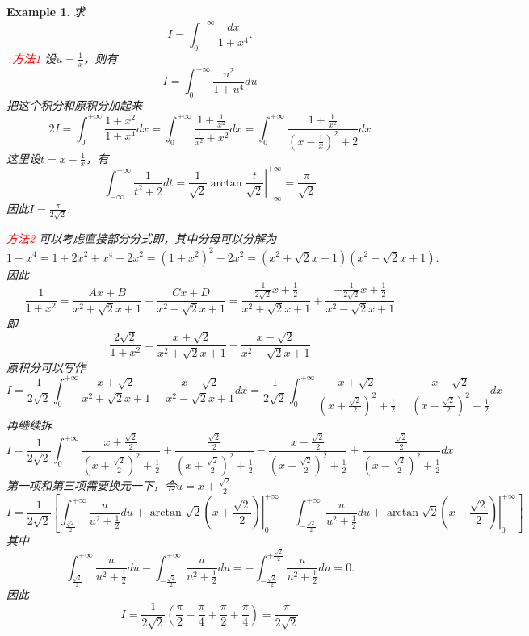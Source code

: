 \documentclass{article}
\newtheorem{example}[theorem]{Example}
\newcommand{\hints}{{\color{blue} \text{hints}}}
\newcommand{\redt}[1]{\textcolor{red}{#1}}
\begin{document}
\begin{example}
\rm 求
$$
I = \int_0^{+\infty} \frac{dx}{1+x^4}.
$$
\hints\ \redt{方法1} 设$u = \frac{1}{x}$，则有
$$
I = \int_0^{+\infty} \frac{u^2}{1+u^4}du
$$
把这个积分和原积分加起来
$$
2I = \int_0^{+\infty} \frac{1+x^2}{1+x^4}dx = \int_0^{+\infty} \frac{1+\frac{1}{x^2}}{\frac{1}{x^2}+x^2}dx = \int_0^{+\infty} \frac{1+\frac{1}{x^2}}{(x-\frac{1}{x})^2+2}dx
$$
这里设$t = x-\frac{1}{x}$，有
$$
\int_{-\infty}^{+\infty} \frac{1}{t^2+2}dt = \left. \frac{1}{\sqrt{2}}\arctan \frac{t}{\sqrt{2}}\right|_{-\infty}
^{+\infty} = \frac{\pi}{\sqrt{2}}
$$
因此$I = \frac{\pi}{2\sqrt{2}}$. 

\redt{方法2} 可以考虑直接部分分式即，其中分母可以分解为
$$
1+x^4 = 1+2x^2+x^4 - 2x^2 = (1+x^2)^2 - 2x^2 = (x^2+\sqrt{2}x+1)(x^2-\sqrt{2}x+1).   
$$
因此
$$
\frac{1}{1+x^2} = \frac{Ax+B}{x^2+\sqrt{2}x+1} + \frac{Cx+D}{x^2-\sqrt{2}x+1} = \frac{\frac{1}{2\sqrt{2}}x+\frac{1}{2}}{x^2+\sqrt{2}x+1} + \frac{-\frac{1}{2\sqrt{2}}x+\frac{1}{2}}{x^2-\sqrt{2}x+1}
$$
即
$$
\frac{2\sqrt{2}}{1+x^2} = \frac{x+\sqrt{2}}{x^2+\sqrt{2}x+1} - \frac{x-\sqrt{2}}{x^2-\sqrt{2}x+1}
$$
原积分可以写作
$$
I = \frac{1}{2\sqrt{2}} \int_0^{+\infty} \frac{x+\sqrt{2}}{x^2+\sqrt{2}x+1} - \frac{x-\sqrt{2}}{x^2-\sqrt{2}x+1} dx = \frac{1}{2\sqrt{2}} \int_0^{+\infty} \frac{x+\sqrt{2}}{(x+\frac{\sqrt{2}}{2})^2+\frac{1}{2}} - \frac{x-\sqrt{2}}{(x-\frac{\sqrt{2}}{2})^2+\frac{1}{2}} dx
$$
再继续拆
$$
I = \frac{1}{2\sqrt{2}} \int_0^{+\infty} \frac{x+\frac{\sqrt{2}}{2}}{(x+\frac{\sqrt{2}}{2})^2+\frac{1}{2}} + \frac{\frac{\sqrt{2}}{2}}{(x+\frac{\sqrt{2}}{2})^2+\frac{1}{2}} - \frac{x-\frac{\sqrt{2}}{2}}{(x-\frac{\sqrt{2}}{2})^2+\frac{1}{2}} + \frac{\frac{\sqrt{2}}{2}}{(x-\frac{\sqrt{2}}{2})^2+\frac{1}{2}} dx
$$
第一项和第三项需要换元一下，令$u = x+\frac{\sqrt{2}}{2}$
$$
I = \frac{1}{2\sqrt{2}} \left[ \int_{\frac{\sqrt{2}}{2}}^{+\infty} \frac{u}{u^2+\frac{1}{2}}du  + \arctan \sqrt{2}\left.\left(x+\frac{\sqrt{2}}{2}\right)\right|_0^{+\infty}-\int_{-\frac{\sqrt{2}}{2}}^{+\infty} \frac{u}{u^2+\frac{1}{2}}du + \arctan \sqrt{2}\left.\left(x-\frac{\sqrt{2}}{2}\right)\right|_0^{+\infty}\right]
$$
其中
$$
\int_{\frac{\sqrt{2}}{2}}^{+\infty} \frac{u}{u^2+\frac{1}{2}}du - \int_{-\frac{\sqrt{2}}{2}}^{+\infty} \frac{u}{u^2+\frac{1}{2}}du =  - \int_{-\frac{\sqrt{2}}{2}}^{+\frac{\sqrt{2}}{2}} \frac{u}{u^2+\frac{1}{2}}du = 0. 
$$
因此
$$
I = \frac{1}{2\sqrt{2}}\left(\frac{\pi}{2}-\frac{\pi}{4} + \frac{\pi}{2}+\frac{\pi}{4}\right) = \frac{\pi}{2\sqrt{2}}
$$
\end{example}
\end{document}

